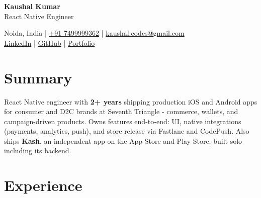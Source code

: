 \documentclass[a4paper,11pt]{article}
\begin{document}
\begin{center}
    {\Huge \textbf{Kaushal Kumar}} \\
    \vspace{1mm}
    {\large React Native Engineer} \\
    \vspace{2mm}

    \small
    Noida, India |
    \href{tel:+917499999362}{+91 7499999362} |
    \href{mailto:kaushal.codes@gmail.com}{kaushal.codes@gmail.com} \\

    \href{https://linkedin.com/in/kaushalrathour}{LinkedIn} |
    \href{https://github.com/kaushalrathour}{GitHub} |
    \href{https://kaushalrathour.appmatters.in/}{Portfolio}

\end{center}

\vspace{-4mm}

\section*{Summary}

\justifying
React Native engineer with \textbf{2+ years} shipping production iOS and Android apps for consumer and D2C brands at Seventh Triangle - commerce, wallets, and campaign-driven products. Owns features end-to-end: UI, native integrations (payments, analytics, push), and store release via Fastlane and CodePush. Also ships \textbf{Kash}, an independent app on the App Store and Play Store, built solo including its backend.

\section*{Experience}
\end{document}
